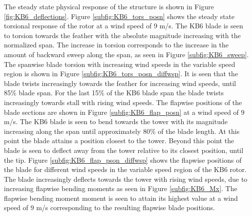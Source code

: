 The steady state physical response of the structure is shown in Figure \ref{fig:KB6_deflections}. Figure \ref{subfig:KB6_tors_posn} shows the steady state torsional response of the rotor at a wind speed of 9 m/s. The KB6 blade is seen to torsion towards the feather with the absolute magnitude increasing with the normalized span. The increase in torsion corresponds to the increase in the amount of backward sweep along the span, as seen in Figure \ref{subfig:KB6_sweep}. The spanwise blade torsion with increasing wind speeds in the variable speed region is shown in Figure \ref{subfig:KB6_tors_posn_diffwsp}. It is seen that the blade twists increasingly towards the feather for increasing wind speeds, until 85\% blade span. For the last 15\% of the KB6 blade span the blade twists increasingly towards stall with rising wind speeds. %
The flapwise positions of the blade sections are shown in Figure \ref{subfig:KB6_flap_posn} at a wind speed of 9 m/s. The KB6 blade is seen to bend towards the tower with its magnitude increasing along the span until approximately 80\% of the blade length. At this point the blade attains a position closest to the tower. Beyond this point the blade is seen to deflect away from the tower relative to its closest position, until the tip. %
Figure \ref{subfig:KB6_flap_pson_diffwsp} shows the flapwise positions of the blade for different wind speeds in the variable speed region of the KB6 rotor. The blade increasingly deflects towards the tower with rising wind speeds, due to increasing flapwise bending moments as seen in Figure \ref{subfig:KB6_Mx}. The flapwise bending moment moment is seen to attain its highest value at a wind speed of 9 m/s corresponding to the resulting flapwise blade positions.

